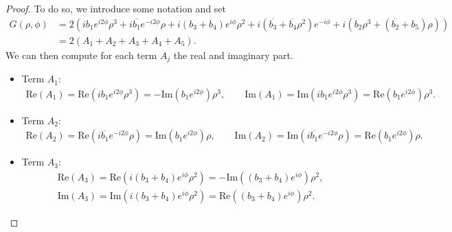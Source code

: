 \documentclass[10pt,a4paper]{amsart}
\newcommand{\im}[1]{\mathrm{Im} \left(#1\right)}
\newcommand{\re}[1]{\mathrm{Re}\left(#1\right)}
\begin{document}
\begin{proof}
    To do so, we introduce some notation and set
    \begin{equation*}
    \begin{aligned}
        G(\rho, \phi)
        &= 2 \left( ib_1e^{i2\phi} \rho^3 + i \overline{b_1} e^{-i2\phi} \rho + i(b_3 + b_4) e^{i\phi} \rho^2 + i (\overline{b_3} + \overline{b_4} \rho^2) e^{-i\phi} + i \left( b_2 \rho^3 + (\overline{b_2} + b_5) \rho \right) \right)\\
        &= 2 \left( A_1 + A_2 + A_3 + A_4 + A_5 \right).
    \end{aligned}
    \end{equation*}
    We can then compute for each term $A_j$ the real and imaginary part.
    \begin{itemize}
        \item Term $A_1$:
        \begin{equation*}
        \begin{aligned}
        \re{A_1} = \re{ib_1 e^{i2\phi} \rho^3} = - \im{b_1 e^{i2\phi}} \rho^3, \qquad 
        \im{A_1} = \im{ib_1 e^{i2\phi} \rho^3} = \re{b_1 e^{i2\phi}} \rho^3.
        \end{aligned}
        \end{equation*}
    
        \item Term $A_2$:
        \begin{equation*}
        \begin{aligned}
        \re{A_2} = \re{i\overline{b_1} e^{-i2\phi} \rho} = \im{b_1 e^{i2\phi}} \rho, \qquad \im{A_2} = \im{i\overline{b_1} e^{-i2\phi} \rho} = \re{b_1 e^{i2\phi}} \rho .
        \end{aligned}
        \end{equation*}
    
        \item Term $A_3$:
        \begin{equation*}
        \begin{aligned}
        &\re{A_3} = \re{i(b_3 + b_4) e^{i\phi} \rho^2} = - \im{(b_3 + b_4) e^{i\phi}} \rho^2,\\[5pt]
        &\im{A_3} = \im{i(b_3 + b_4) e^{i\phi} \rho^2} = \re{(b_3 + b_4) e^{i\phi}} \rho^2 .
        \end{aligned}
        \end{equation*}
    

\end{itemize}
\end{proof}
\end{document}
